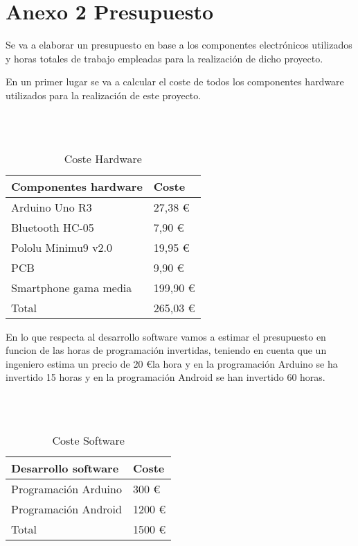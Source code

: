 \chapter*{Anexo 2 Presupuesto} %
	
	Se va a elaborar un presupuesto en base a los componentes electr\'onicos utilizados y horas totales de trabajo empleadas para la realizaci\'on de dicho proyecto.
	
	En un primer lugar se va a calcular el coste de todos los componentes hardware utilizados para la realizaci\'on de este proyecto.
	
	\
	\\
	\
	
	\begin{table}[H]
		\centering
		\begin{tabular}{p{5cm} p{5cm}}
			Componentes hardware & Coste \\
			\hline \hline
			Arduino Uno R3 & 27,38 \euro \\
			\hline
			Bluetooth HC-05 & 7,90 \euro \\
			\hline
			Pololu Minimu9 v2.0 & 19,95 \euro \\
			\hline
			PCB & 9,90 \euro \\
			\hline
			Smartphone gama media & 199,90 \euro \\
			\hline \hline
			Total & 265,03 \euro \\
			\hline
		\end{tabular}
		\caption{Coste Hardware}
		\label{tabla:LibreriasMota}
	\end{table}
	
	En lo que respecta al desarrollo software vamos a estimar el presupuesto en funcion de las horas de programaci\'on invertidas, teniendo en cuenta que un ingeniero estima un precio de 20 \euro  la hora y en la programaci\'on Arduino se ha invertido 15 horas y en la programaci\'on Android se han invertido 60 horas.
	
	\
	\\
	\
	
	\begin{table}[H]
		\centering
		\begin{tabular}{p{6cm} p{5cm}}
			Desarrollo software & Coste \\
			\hline \hline
			Programaci\'on Arduino & 300 \euro \\
			\hline
			Programaci\'on Android & 1200 \euro \\
			\hline \hline
			Total & 1500 \euro \\
			\hline
		\end{tabular}
		\caption{Coste Software}
		\label{tabla:LibreriasMota}
	\end{table}
	
